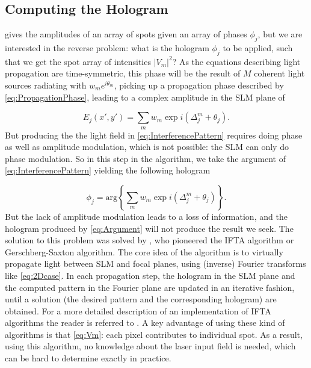 \subsection{Computing the Hologram}\label{sec:GSW}

 gives the amplitudes of an array of spots given an array of phases $\phi_j$, but we are interested in the reverse problem: what is the hologram $\phi_j$ to be applied, such that we get the spot array of intensities $|V_m|^2$? 
As the equations describing light propagation are time-symmetric, this phase will be the result of $M$ coherent light sources radiating with $w_m e^{i \theta_m}$, picking up a propagation phase described by \cref{eq:PropagationPhase}, leading to a complex amplitude in the \ac{SLM} plane of \cite{DiLeonardo2007,Leseleuc2018}

\begin{equation}\label{eq:InterferencePattern}
    E_j (x',y') = \sum_m w_m \exp{
    i\left(\Delta_j^m + \theta_j\right)
    }.
\end{equation}
But producing the the light field in \cref{eq:InterferencePattern} requires doing phase as well as amplitude modulation, which is not possible: the SLM can only do phase modulation.
So in this step in the algorithm, we take the argument of  \cref{eq:InterferencePattern} yielding the following hologram

\begin{equation}\label{eq:Argument}
    \phi_j = \text{arg}\left\{
     \sum_m w_m \exp{
    i\left(\Delta_j^m + \theta_j\right)
    }
    \right\}.
\end{equation}
But the lack of amplitude modulation leads to a loss of information, and the hologram produced by \cref{eq:Argument} will not produce the result we seek.
The solution to this problem was solved by \cite{Gerschberg1972}, who pioneered the \ac{IFTA} algorithm or Gerschberg-Saxton algorithm.
The core idea of the algorithm is to virtually propagate light between SLM and focal planes, using (inverse) Fourier transforms like \cref{eq:2Dcase}.
In each propagation step, the hologram in the SLM plane and the computed pattern in the Fourier plane are updated in an iterative fashion, until a solution (the desired pattern and the corresponding hologram) are obtained.
For a more detailed description of an implementation of IFTA algorithms the reader is referred to \cite{Bijnen2015,Bijnen2013}.
A key advantage of using these kind of algorithms is that \cref{eq:Vm}: each pixel contributes to individual spot.
As a result, using this algorithm, no knowledge about the laser input field is needed, which can be hard to determine exactly in practice.

